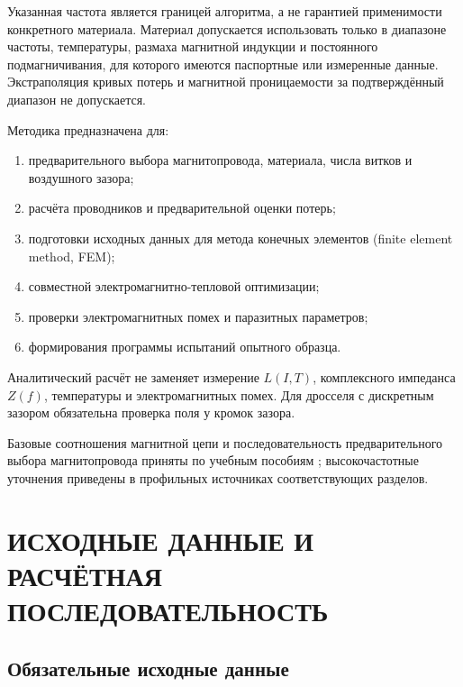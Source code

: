 \documentclass[14pt,a4paper]{extarticle}
\begin{document}
Указанная частота является границей алгоритма, а не гарантией применимости
конкретного материала. Материал допускается использовать только в диапазоне
частоты, температуры, размаха магнитной индукции и постоянного
подмагничивания, для которого имеются паспортные или измеренные данные.
Экстраполяция кривых потерь и магнитной проницаемости за подтверждённый
диапазон не допускается.

Методика предназначена для:

\begin{enumerate}
\item предварительного выбора магнитопровода, материала, числа витков и
воздушного зазора;
\item расчёта проводников и предварительной оценки потерь;
\item подготовки исходных данных для метода конечных элементов
(finite element method, FEM);
\item совместной электромагнитно-тепловой оптимизации;
\item проверки электромагнитных помех и паразитных параметров;
\item формирования программы испытаний опытного образца.
\end{enumerate}

Аналитический расчёт не заменяет измерение $L(I,T)$, комплексного импеданса
$Z(f)$, температуры и электромагнитных помех. Для дросселя с дискретным
зазором обязательна проверка поля у кромок зазора.

Базовые соотношения магнитной цепи и последовательность предварительного
выбора магнитопровода приняты по учебным пособиям
\cite{obrusnik,legostaev}; высокочастотные уточнения приведены в профильных
источниках соответствующих разделов.

\section{ИСХОДНЫЕ ДАННЫЕ И РАСЧЁТНАЯ ПОСЛЕДОВАТЕЛЬНОСТЬ}
\label{sec:inputs}

\subsection{Обязательные исходные данные}
\end{document}
